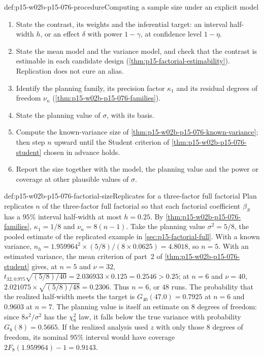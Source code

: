 \begin{hbmethod}{def:p15-w02b-p15-076-procedure}{Computing a sample size under an explicit model}
\begin{enumerate}
\item State the contrast, its weights and the inferential target: an
      interval half-width \(h\), or an effect \(\delta\) with power
      \(1-\gamma\), at confidence level \(1-\eta\).
\item State the mean model and the variance model, and check that the
      contrast is estimable in each candidate design
      (\cref{thm:p15-factorial-estimability}). Replication does not cure an
      alias.
\item Identify the planning family, its precision factor \(\kappa_1\) and
      its residual degrees of freedom \(\nu_n\)
      (\cref{thm:p15-w02b-p15-076-families}).
\item State the planning value of \(\sigma\), with its basis.
\item Compute the known-variance size of
      \cref{thm:p15-w02b-p15-076-known-variance}; then step \(n\) upward
      until the Student criterion of
      \cref{thm:p15-w02b-p15-076-student} chosen in advance holds.
\item Report the size together with the model, the planning value and the
      power or coverage at other plausible values of \(\sigma\).
\end{enumerate}
\end{hbmethod}

\begin{hbexample}{def:p15-w02b-p15-076-factorial-size}{Replicates for a three-factor full factorial}
Plan replicates \(n\) of the three-factor full factorial so that each
factorial coefficient \(\beta_S\) has a \(95\%\) interval half-width at
most \(h=0.25\). By \cref{thm:p15-w02b-p15-076-families},
\(\kappa_1=1/8\) and \(\nu_n=8(n-1)\). Take the planning value
\(\sigma^2=5/8\), the pooled estimate of the replicated example in
\cref{sec:p15-factorial-full}. With a known variance,
\(n_h=1.959964^2\times(5/8)/(8\times0.0625)=4.8018\), so \(n=5\). With an
estimated variance, the mean criterion of part~2 of
\cref{thm:p15-w02b-p15-076-student} gives, at \(n=5\) and \(\nu=32\),
\(t_{32,0.975}\sqrt{(5/8)/40}=2.036933\times0.125=0.2546>0.25\); at
\(n=6\) and \(\nu=40\), \(2.021075\times\sqrt{(5/8)/48}=0.2306\). Thus
\(n=6\), or \(48\) runs. The probability that the realized half-width
meets the target is \(G_{40}(47.0)=0.7925\) at \(n=6\) and \(0.9603\) at
\(n=7\). The planning value is itself an estimate on \(8\) degrees of
freedom: since \(8s^2/\sigma^2\) has the \(\chi^2_8\) law, it falls below
the true variance with probability \(G_8(8)=0.5665\). If the realized
analysis used \(z\) with only those \(8\) degrees of freedom, its nominal
\(95\%\) interval would have coverage \(2F_8(1.959964)-1=0.9143\).
\end{hbexample}

